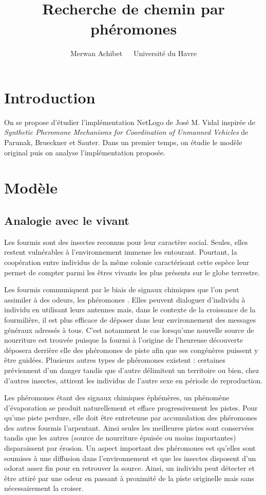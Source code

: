 \documentclass[12pt]{article}
\title{Recherche de chemin par phéromones}
\author{Merwan Achibet $\;$ \textendash $\;$  Université du Havre}
\date{}
\begin{document}
\maketitle

\section*{Introduction}

On se propose d'étudier l'implémentation NetLogo de José M. Vidal
inspirée de \textit{Synthetic Pheromone Mechanisms for Coordination of
  Unmanned Vehicles} de Parunak, Brueckner et Sauter. Dans un premier
temps, on étudie le modèle original puis on analyse
l'implémentation proposée.

\section{Modèle}

\subsection{Analogie avec le vivant}

Les fourmis sont des insectes reconnus pour leur caractère
social. Seules, elles restent vulnérables à l'environnement immense
les entourant. Pourtant, la coopération entre individus de la même
colonie caractérisant cette espèce leur permet de compter
parmi les êtres vivants les plus présents sur le globe terrestre.

Les fourmis communiquent par le biais de signaux chimiques que l'on peut assimiler à des odeurs, les phéromones
\cite{insectes}. Elles peuvent dialoguer d'individu à individu en
utilisant leurs antennes mais, dans le contexte de la croissance de la
fourmilière, il est plus efficace de déposer dans leur environnement
des messages généraux adressés à tous. C'est notamment le cas
lorsqu'une nouvelle source de nourriture est trouvée puisque la
fourmi à l'origine de l'heureuse découverte déposera derrière elle des
phéromones de piste afin que ses congénères puissent y être
guidées. Plusieurs autres types de phéromones existent : certaines préviennent d'un
danger tandis que d'autre délimitent un territoire ou bien, chez d'autres insectes, attirent les individus de l'autre sexe
en période de reproduction.

Les phéromones étant des signaux chimiques éphémères, un phénomène
d'évaporation se produit naturellement et efface progressivement les pistes. 
Pour qu'une piste perdure, elle doit être entretenue par accumulation des phéromones
des autres fourmis l'arpentant. Ainsi seules les meilleures pistes sont conservées tandis que
les autres (source de nourriture épuisée ou moins importantes) disparaissent par érosion.
Un aspect important des phéromones est qu'elles sont soumises à une diffusion
dans l'environnement et que les insectes disposent d'un odorat assez fin pour en retrouver 
la source. Ainsi, un individu peut détecter et être attiré par une odeur en passant à proximité de la piste originelle
mais sans nécessairement la croiser.
\end{document}
